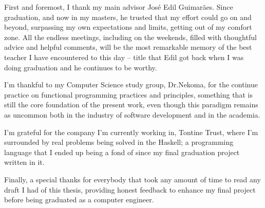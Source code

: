 First and foremost, I thank my main advisor José Edil Guimarães.
Since graduation, and now in my masters, he trusted that my effort could go on and beyond, surpassing my own expectations
and limits, getting out of my comfort zone. All the endless meetings, including on the weekends, filled with thoughtful advice and helpful comments,
will be the most remarkable memory of the best teacher I have encountered to this day -- title that Edil got back when I was doing graduation and he
continues to be worthy.

I'm thankful to my Computer Science study group, Dr.Nekoma, for the continue practice on functional programming practices and principles, something that is
still the core foundation of the present work, even though this paradigm remains as uncommon both in the industry of software development and in the academia.

I'm grateful for the company I'm currently working in, Tontine Trust, where I'm surrounded by real problems being solved in the Haskell; a programming language
that I ended up being a fond of since my final graduation project written in it.

Finally, a special thanks for everybody that took any amount of time to read any draft I had of this thesis, providing honest feedback to enhance my final project
before being graduated as a computer engineer. 
